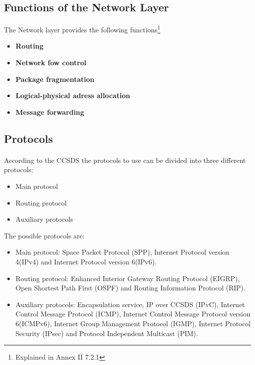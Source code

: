 %
%
%
%
%
%
%

\subsection{Functions of the Network Layer}
The Network layer provides the following functions\footnote{Explained in Annex II 7.2.1}
\begin{itemize}
\item \textbf{Routing}
\item \textbf{Network fow control}
\item \textbf{Package fragmentation}
\item \textbf{Logical-physical adress allocation}
\item \textbf{Message forwarding}
\end{itemize}

\subsection{Protocols}
\paragraph{}According to the CCSDS the protocols to use can be divided into three different protocols: 
\begin{itemize}
\item Main protocol
\item Routing protocol
\item Auxiliary protocols
\end{itemize}
The possible protocols are:
\begin{itemize}
\item Main protocol: Space Packet Protocol (SPP), Internet Protocol version 4(IPv4) and Internet Protocol version 6(IPv6).
\item Routing protocol: Enhanced Interior Gateway Routing Protocol (EIGRP), Open Shortest Path First (OSPF) and Routing Information Protocol (RIP).
\item Auxiliary protocols: Encapsulation service, IP over CCSDS (IPvC), Internet Control Message Protocol (ICMP), Internet Control Message Protocol version 6(ICMPv6), Internet Group Management Protocol (IGMP), Internet Protocol Security (IPsec) and Protocol Independent Multicast (PIM).
\end{itemize}
